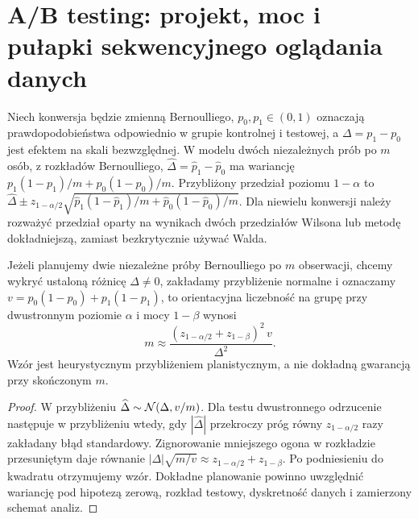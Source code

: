 \section{A/B testing: projekt, moc i pułapki sekwencyjnego oglądania danych}
\begin{przyklad}
Niech konwersja będzie zmienną Bernoulliego, $p_0,p_1\in(0,1)$ oznaczają prawdopodobieństwa odpowiednio w grupie kontrolnej i testowej, a $\Delta=p_1-p_0$ jest efektem na skali bezwzględnej. W modelu dwóch niezależnych prób po $m$ osób, z rozkładów Bernoulliego, $\widehat\Delta=\widehat p_1-\widehat p_0$ ma wariancję $p_1(1-p_1)/m+p_0(1-p_0)/m$. Przybliżony przedział poziomu $1-\alpha$ to $\widehat\Delta\pm z_{1-\alpha/2}\sqrt{\widehat p_1(1-\widehat p_1)/m+\widehat p_0(1-\widehat p_0)/m}$. Dla niewielu konwersji należy rozważyć przedział oparty na wynikach dwóch przedziałów Wilsona lub metodę dokładniejszą, zamiast bezkrytycznie używać Walda.
\end{przyklad}

\begin{stwierdzenie}\label{prop:ab-samplesize}
Jeżeli planujemy dwie niezależne próby Bernoulliego po $m$ obserwacji, chcemy wykryć ustaloną różnicę $\Delta\ne0$, zakładamy przybliżenie normalne i oznaczamy $v=p_0(1-p_0)+p_1(1-p_1)$, to orientacyjna liczebność na grupę przy dwustronnym poziomie $\alpha$ i mocy $1-\beta$ wynosi
\[
 m\approx\frac{(z_{1-\alpha/2}+z_{1-\beta})^2\,v}{\Delta^2}.
\]
Wzór jest heurystycznym przybliżeniem planistycznym, a nie dokładną gwarancją przy skończonym $m$.
\end{stwierdzenie}
\begin{proof}
W przybliżeniu $\widehat\Delta\sim\mathcal N(\Delta,v/m)$. Dla testu dwustronnego odrzucenie następuje w przybliżeniu wtedy, gdy $|\widehat\Delta|$ przekroczy próg równy $z_{1-\alpha/2}$ razy zakładany błąd standardowy. Zignorowanie mniejszego ogona w rozkładzie przesuniętym daje równanie $|\Delta|\sqrt{m/v}\approx z_{1-\alpha/2}+z_{1-\beta}$. Po podniesieniu do kwadratu otrzymujemy wzór. Dokładne planowanie powinno uwzględnić wariancję pod hipotezą zerową, rozkład testowy, dyskretność danych i zamierzony schemat analiz.
\end{proof}

